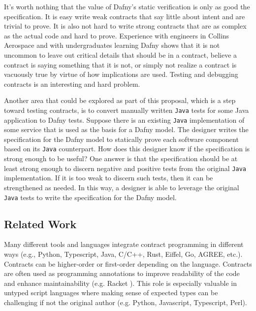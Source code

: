 \documentclass[11pt,onecolumn,notitlepage]{article}
\begin{document}
It's worth nothing that the value of Dafny's static verification is only as good the specification. It is easy write weak contracts that say little about intent and are trivial to prove. It is also not hard to write strong contracts that are as complex as the actual code and hard to prove. Experience with engineers in Collins Aerospace and with undergraduates learning Dafny shows that it is not uncommon to leave out critical details that should be in a contract, believe a contract is saying something that it is not, or simply not realize a contract is vacuously true by virtue of how implications are used. Testing and debugging contracts is an interesting and hard problem. 

Another area that could be explored as part of this proposal, which is a step toward testing contracts, is to convert manually written \texttt{Java} tests for some Java application to Dafny tests. Suppose there is an existing \texttt{Java} implementation of some service that is used as the basis for a Dafny model. The designer writes the specification for the Dafny model to statically prove each software component based on its \texttt{Java} counterpart. How does this designer know if the specification is strong enough to be useful? One answer is that the specification should be at least strong enough to discern negative and positive tests from the original \texttt{Java} implementation. If it is too weak to discern such tests, then it can be strengthened as needed. In this way, a designer is able to leverage the original \texttt{Java} tests to write the specification for the Dafny model.
 
\subsection*{Related Work}

Many different tools and languages integrate contract programming in different ways (e.g., Python, Typescript, Java, C/C++, Rust, Eiffel, Go, AGREE, etc.). Contracts can be higher-order or first-order depending on the language. Contracts are often used as programming annotations to improve readability of the code and enhance maintainability (e.g. Racket \cite{10.1145/3022670.2951930,10.1145/583852.581484,10.1145/2034574.2034800}). This role is especially valuable in untyped script languages where making sense of expected types can be challenging if not the original author (e.g. Python, Javascript, Typescript, Perl). 
\end{document}
